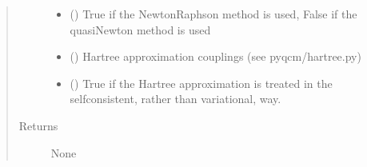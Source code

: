 \documentclass[letterpaper,10pt,english]{sphinxmanual}
\begin{document}
\begin{fulllineitems}
\begin{quote}
\begin{description}
\begin{itemize}
\item {} 
\sphinxAtStartPar
{} () \textendash{} True if the Newton\sphinxhyphen{}Raphson method is used, False if the quasi\sphinxhyphen{}Newton method is used

\item {} 
\sphinxAtStartPar
{} (\sphinxstyleliteralemphasis{\sphinxupquote{(}}\sphinxstyleliteralemphasis{\sphinxupquote{)}}) \textendash{} Hartree approximation couplings (see pyqcm/hartree.py)

\item {} 
\sphinxAtStartPar
{} () \textendash{} True if the Hartree approximation is treated in the self\sphinxhyphen{}consistent, rather than variational, way.

\end{itemize}

\item[{Returns}] \leavevmode
\sphinxAtStartPar
None

\end{description}\end{quote}

\end{fulllineitems}

\end{document}

